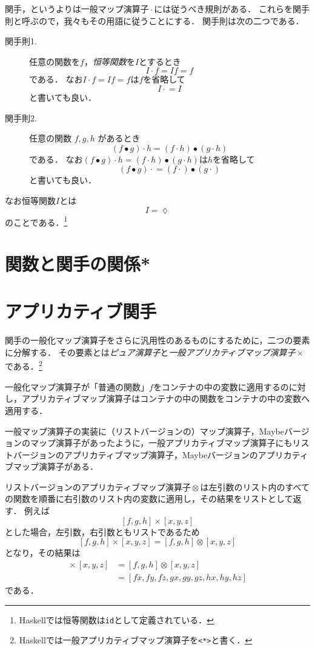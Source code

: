\documentclass[twocolumn]{jsbook}
\newcommand{\keyword}[1]{\emph{#1}}
\newcommand{\code}[1]{\texttt{#1}}
\DeclareMathOperator{\hsklApplicativeMap}{\times}
\DeclareMathOperator{\hsklApplicativeListMap}{\otimes}
\DeclareMathOperator{\hsklFmap}{\cdot}
\DeclareMathOperator{\mathCompose}{\bullet}
\newcommand{\mathLambdaAnonymousParameter}{\lozenge}
\begin{document}
関手，というよりは一般マップ演算子$\hsklFmap$には従うべき規則がある．
これらを関手則と呼ぶので，我々もその用語に従うことにする．
関手則は次の二つである．
\begin{description}
\item[関手則1.] 任意の関数を$f$，\keyword{恒等関数}を$I$とするとき
$$I\hsklFmap f=If=f$$
である．
なお$I\hsklFmap f=If=f$は$f$を省略して
$$I\hsklFmap=I$$
と書いても良い．
\item[関手則2.] 任意の関数 $f,g,h$ があるとき
$$(f\mathCompose g)\hsklFmap h=(f\hsklFmap h)\mathCompose(g\hsklFmap h)$$
である．
なお$(f\mathCompose g)\hsklFmap h=(f\hsklFmap h)\mathCompose(g\hsklFmap h)$は$h$を省略して$$(f\mathCompose g)\hsklFmap=(f\hsklFmap)\mathCompose(g\hsklFmap)$$と書いても良い．
\end{description}
なお恒等関数$I$とは
$$I=\mathLambdaAnonymousParameter$$
のことである．\footnote{Haskellでは恒等関数は\code{id}として定義されている．}

\section{関数と関手の関係*}


\section{アプリカティブ関手}

関手の一般化マップ演算子をさらに汎用性のあるものにするために，二つの要素に分解する．
その要素とは\keyword{ピュア演算子}と\keyword{一般アプリカティブマップ演算子}$\hsklApplicativeMap$である．\footnote{Haskellでは一般アプリカティブマップ演算子を\code{<*>}と書く．}

一般化マップ演算子が「普通の関数」$f$をコンテナの中の変数に適用するのに対し，アプリカティブマップ演算子はコンテナの中の関数をコンテナの中の変数へ適用する．

一般マップ演算子の実装に（リストバージョンの）マップ演算子，Maybeバージョンのマップ演算子があったように，一般アプリカティブマップ演算子にもリストバージョンのアプリカティブマップ演算子，Maybeバージョンのアプリカティブマップ演算子がある．

リストバージョンのアプリカティブマップ演算子$\hsklApplicativeListMap$は左引数のリスト内のすべての関数を順番に右引数のリスト内の変数に適用し，その結果をリストとして返す．
例えば$$[f,g,h]\hsklApplicativeMap[x,y,z]$$とした場合，左引数，右引数ともリストであるため$$[f,g,h]\hsklApplicativeMap[x,y,z]=[f,g,h]\hsklApplicativeListMap[x,y,z]$$となり，その結果は
\begin{align*}
[f,g,h]\hsklApplicativeMap[x,y,z]&=[f,g,h]\hsklApplicativeListMap[x,y,z]\\
&=[fx,fy,fz,gx,gy,gz,hx,hy,hz]
\end{align*}
である．
\end{document}
